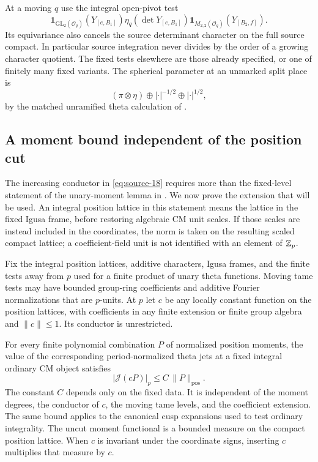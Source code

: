 At a moving $q$ use the integral open-pivot test
\[
 \mathbf1_{\mathrm{GL}_2(\mathcal O_q)}(Y_{[e,B_1]})
 \eta_q(\det Y_{[e,B_1]})
 \mathbf1_{M_{2,2}(\mathcal O_q)}(Y_{[B_2,f]}).
\]
Its equivariance also cancels the source determinant character on
the full source compact.  In particular source integration never
divides by the order of a growing character quotient.  The fixed
tests elsewhere are those already specified, or one of finitely many
fixed variants.  The spherical parameter at an unmarked split place is
\[
 (\pi\otimes\eta)\oplus|\cdot|^{-1/2}\oplus|\cdot|^{1/2},
\]
by the matched unramified theta calculation of
\cite[Lemma 4.2 and Equation (4.10)]{C}.

\subsection{A moment bound independent of the position cut}

The increasing conductor in \eqref{eq:source-18} requires more than
the fixed-level statement of the unary-moment lemma in
\cite[Section 4]{C}.  We now prove the extension that will be used.
An integral position lattice in this statement means the lattice in
the fixed Igusa frame, before restoring algebraic CM unit scales.
If those scales are instead included in the coordinates, the norm
is taken on the resulting scaled compact lattice; a coefficient-field
unit is not identified with an element of $\mathbb Z_p$.

\begin{lemma}\label{theta:cut-moments}
Fix the integral position lattices, additive characters, Igusa
frames, and the finite tests away from $p$ used for a finite product
of unary theta functions.  Moving tame tests may have bounded
group-ring coefficients and additive Fourier normalizations that
are $p$-units.  At $p$ let $c$ be any locally constant function on
the position lattices, with
coefficients in any finite extension or finite group algebra and
$\|c\|\leq1$.  Its conductor is unrestricted.

For every finite polynomial combination $P$ of normalized position
moments, the value of the corresponding period-normalized theta
jets at a fixed integral ordinary CM object satisfies
\[
       \bigl|\mathcal J(cP)\bigr|_p
       \leq C\,\|P\|_{\mathrm{pos}}.
\]
The constant $C$ depends only on the fixed data.  It is independent
of the moment degrees, the conductor of $c$, the moving tame levels,
and the coefficient extension.  The same bound applies to the
canonical cusp expansions used to test ordinary integrality.
The uncut moment functional is a bounded measure on the compact
position lattice.  When $c$ is invariant under the coordinate
signs, inserting $c$ multiplies that measure by $c$.
\end{lemma}

